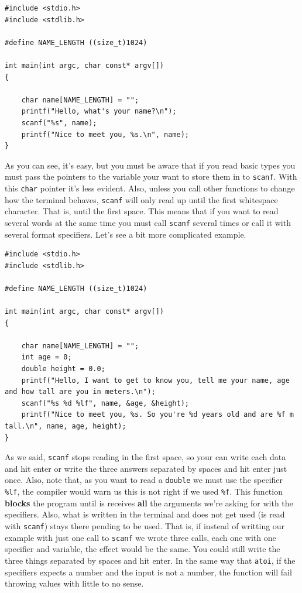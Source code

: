 \documentclass[a4paper]{article}
\begin{document}
\noindent
\begin{minipage}[H]{\linewidth}
\mbox{}
\begin{lstlisting}[style=C,
caption={\texttt{scanf} basic example},
label={lst:basicScanf}]
#include <stdio.h>
#include <stdlib.h>

#define NAME_LENGTH ((size_t)1024)

int main(int argc, char const* argv[])
{

    char name[NAME_LENGTH] = "";
    printf("Hello, what's your name?\n");
    scanf("%s", name);
    printf("Nice to meet you, %s.\n", name);
}
\end{lstlisting}
\end{minipage}

As you can see, it's easy, but you must be aware that if you read basic types
you must pass the pointers to the variable your want to store them in to
\texttt{scanf}. With this \verb!char! pointer it's less evident. Also, unless
you call other functions to change how the terminal behaves, \verb!scanf! will
only read up until the first whitespace character. That is, until the first
space. This means that if you want to read several words at the same time you
must call \verb!scanf! several times or call it with several format specifiers.
Let's see a bit more complicated example.

\noindent
\begin{minipage}[H]{\linewidth}
\mbox{}
\begin{lstlisting}[style=C,
caption={\texttt{scanf} advanced example},
label={lst:scanfExample}]
#include <stdio.h>
#include <stdlib.h>

#define NAME_LENGTH ((size_t)1024)

int main(int argc, char const* argv[])
{

    char name[NAME_LENGTH] = "";
    int age = 0;
    double height = 0.0;
    printf("Hello, I want to get to know you, tell me your name, age and how tall are you in meters.\n");
    scanf("%s %d %lf", name, &age, &height);
    printf("Nice to meet you, %s. So you're %d years old and are %f m tall.\n", name, age, height);
}
\end{lstlisting}
\end{minipage}

As we said, \verb!scanf! stops reading in the first space, so your can write
each data and hit enter or write the three answers separated by spaces and hit
enter just once. Also, note that, as you want to read a \verb!double! we must
use the specifier \verb!%lf!, the
compiler would warn us this is not right if we used \verb!%f!. This function
\textbf{blocks} the program until is receives \textbf{all} the arguments we're
asking for with the specifiers. Also, what is written in the terminal and does
not get used (is read with \verb!scanf!) stays there pending to be used. That
is, if instead of writting our example with just one call to \verb!scanf! we
wrote three calls, each one with one specifier and variable, the effect would be
the same. You could still write the three things separated by spaces and hit
enter. In the same way that \verb!atoi!, if the specifiers expects a number and
the input is not a number, the function will fail throwing values with little to
no sense.
\end{document}
